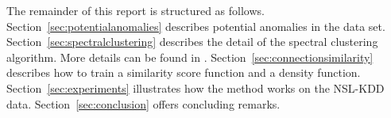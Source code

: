 The remainder of this report is structured as follows. 
Section~\ref{sec:potentialanomalies} describes potential anomalies in the data set. 
Section~\ref{sec:spectralclustering} describes the detail of the spectral clustering algorithm. 
More details can be found in \cite{ulrike07}. 
Section~\ref{sec:connectionsimilarity} describes how to train a similarity score function and a density function. 
Section~\ref{sec:experiments} illustrates how the method works on the NSL-KDD data. 
Section~\ref{sec:conclusion} offers concluding remarks. 

